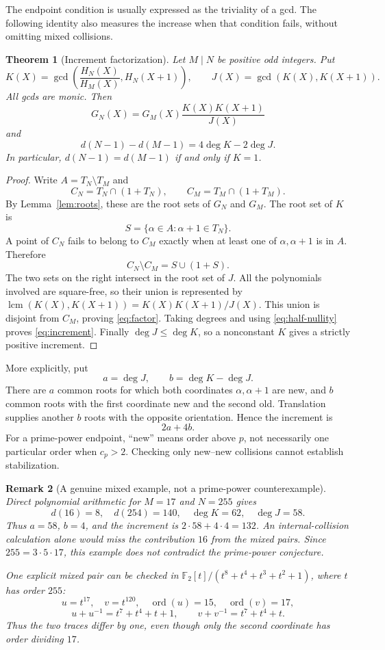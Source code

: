 \documentclass[a4paper]{article}
\newtheorem{theorem}{Theorem}[section]
\newtheorem{remark}[theorem]{Remark}
\newcommand{\F}{\mathbb F}
\newcommand{\ord}{\operatorname{ord}}
\begin{document}
The endpoint condition is usually expressed as the triviality of a gcd.
The following identity also measures the increase when that condition
fails, without omitting mixed collisions.

\begin{theorem}[Increment factorization]\label{thm:increment}
Let $M\mid N$ be positive odd integers.  Put
\[
 K(X)=\gcd\!\left(\frac{H_N(X)}{H_M(X)},H_N(X+1)\right),
 \qquad J(X)=\gcd(K(X),K(X+1)).
\]
All gcds are monic.  Then
\begin{equation}\label{eq:factor}
 G_N(X)=G_M(X)\frac{K(X)K(X+1)}{J(X)}
\end{equation}
and
\begin{equation}\label{eq:increment}
 \boxed{\ d(N-1)-d(M-1)=4\deg K-2\deg J.\ }
\end{equation}
In particular, $d(N-1)=d(M-1)$ if and only if $K=1$.
\end{theorem}

\begin{proof}
Write $A=T_N\setminus T_M$ and
\[
 C_N=T_N\cap(1+T_N),\qquad C_M=T_M\cap(1+T_M).
\]
By Lemma~\ref{lem:roots}, these are the root sets of $G_N$ and $G_M$.
The root set of $K$ is
\[
 S=\{\alpha\in A:\alpha+1\in T_N\}.
\]
A point of $C_N$ fails to belong to $C_M$ exactly when at least one
of $\alpha,\alpha+1$ is in $A$.  Therefore
\[
 C_N\setminus C_M=S\cup(1+S).
\]
The two sets on the right intersect in the root set of $J$.  All the
polynomials involved are square-free, so their union is represented by
$\operatorname{lcm}(K(X),K(X+1))=K(X)K(X+1)/J(X)$.
This union is disjoint from $C_M$, proving \eqref{eq:factor}.
Taking degrees and using \eqref{eq:half-nullity} proves
\eqref{eq:increment}.
Finally $\deg J\leq\deg K$, so a nonconstant $K$ gives a strictly
positive increment.
\end{proof}

More explicitly, put
\[
 a=\deg J,\qquad b=\deg K-\deg J.
\]
There are $a$ common roots for which both coordinates
$\alpha,\alpha+1$ are new, and $b$ common roots with the first
coordinate new and the second old.  Translation supplies another $b$
roots with the opposite orientation.  Hence the increment is
\[
 2a+4b.
\]
For a prime-power endpoint, ``new'' means order above $p$, not
necessarily one particular order when $c_p>2$.
Checking only new--new collisions cannot establish stabilization.

\begin{remark}[A genuine mixed example, not a prime-power counterexample]
Direct polynomial arithmetic for $M=17$ and $N=255$ gives
\[
 d(16)=8,\quad d(254)=140,\quad \deg K=62,\quad \deg J=58.
\]
Thus $a=58$, $b=4$, and the increment is
$2\cdot58+4\cdot4=132$.
An internal-collision calculation alone would miss the contribution
$16$ from the mixed pairs.  Since $255=3\cdot5\cdot17$, this example
does not contradict the prime-power conjecture.

One explicit mixed pair can be checked in
$\F_2[t]/(t^8+t^4+t^3+t^2+1)$, where $t$ has order $255$:
\[
 u=t^{17},\quad v=t^{120},\quad \ord(u)=15,\quad\ord(v)=17,
\]
\[
 u+u^{-1}=t^7+t^4+t+1,\qquad v+v^{-1}=t^7+t^4+t.
\]
Thus the two traces differ by one, even though only the second
coordinate has order dividing $17$.
\end{remark}
\end{document}
